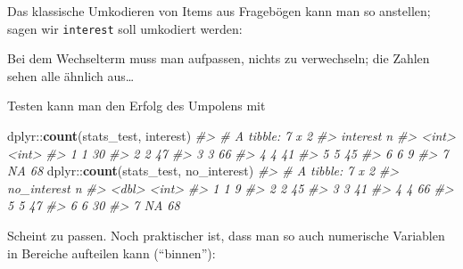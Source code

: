 \documentclass[12pt,ngerman,]{book}
\makeatletter
\newenvironment{Shaded}{\begin{snugshade}}{\end{snugshade}}
\newcommand{\KeywordTok}[1]{\textcolor[rgb]{0.13,0.29,0.53}{\textbf{{#1}}}}
\newcommand{\StringTok}[1]{\textcolor[rgb]{0.31,0.60,0.02}{{#1}}}
\newcommand{\CommentTok}[1]{\textcolor[rgb]{0.56,0.35,0.01}{\textit{{#1}}}}
\newcommand{\NormalTok}[1]{{#1}}
\newenvironment{kframe}{%
\medskip{}
\setlength{\fboxsep}{.8em}
 \def\at@end@of@kframe{}%
 \ifinner\ifhmode%
  \def\at@end@of@kframe{\end{minipage}}%
  \begin{minipage}{\columnwidth}%
 \fi\fi%
 \def\FrameCommand##1{\hskip\@totalleftmargin \hskip-\fboxsep
 \colorbox{shadecolor}{##1}\hskip-\fboxsep
     \hskip-\linewidth \hskip-\@totalleftmargin \hskip\columnwidth}%
 \MakeFramed {\advance\hsize-\width
   \@totalleftmargin\z@ \linewidth\hsize
   \@setminipage}}%
 {\par\unskip\endMakeFramed%
 \at@end@of@kframe}
\renewenvironment{Shaded}{\begin{kframe}}{\end{kframe}}
\theoremstyle{definition}
\theoremstyle{definition}
\theoremstyle{remark}
\makeatother
\begin{document}
Das klassische Umkodieren von Items aus Fragebögen kann man so
anstellen; sagen wir \texttt{interest} soll umkodiert werden:

\begin{Shaded}
\end{Shaded}

Bei dem Wechselterm muss man aufpassen, nichts zu verwechseln; die
Zahlen sehen alle ähnlich aus\ldots{}

Testen kann man den Erfolg des Umpolens mit

\begin{Shaded}
\begin{Highlighting}[]
\NormalTok{dplyr::}\KeywordTok{count}\NormalTok{(stats_test, interest)}
\CommentTok{#> # A tibble: 7 x 2}
\CommentTok{#>   interest     n}
\CommentTok{#>      <int> <int>}
\CommentTok{#> 1        1    30}
\CommentTok{#> 2        2    47}
\CommentTok{#> 3        3    66}
\CommentTok{#> 4        4    41}
\CommentTok{#> 5        5    45}
\CommentTok{#> 6        6     9}
\CommentTok{#> 7       NA    68}
\NormalTok{dplyr::}\KeywordTok{count}\NormalTok{(stats_test, no_interest)}
\CommentTok{#> # A tibble: 7 x 2}
\CommentTok{#>   no_interest     n}
\CommentTok{#>         <dbl> <int>}
\CommentTok{#> 1           1     9}
\CommentTok{#> 2           2    45}
\CommentTok{#> 3           3    41}
\CommentTok{#> 4           4    66}
\CommentTok{#> 5           5    47}
\CommentTok{#> 6           6    30}
\CommentTok{#> 7          NA    68}
\end{Highlighting}
\end{Shaded}

Scheint zu passen. Noch praktischer ist, dass man so auch numerische
Variablen in Bereiche aufteilen kann (``binnen''):

\begin{Shaded}
\end{Shaded}
\end{document}
